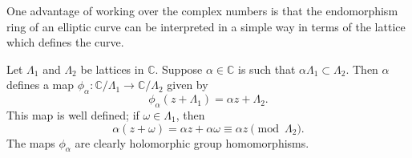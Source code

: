 One advantage of working over the complex numbers is that the endomorphism ring of an
elliptic curve can be interpreted in a simple way in terms of the lattice which
defines the curve.

Let $\Lambda_{1}$ and $\Lambda_{2}$ be lattices in $\mathbb{C}$. Suppose $\alpha \in
\mathbb{C}$ is such that $\alpha\Lambda_{1} \subset \Lambda_{2}$.  Then $\alpha$
defines a map $\phi_{\alpha} \colon \mathbb{C}/\Lambda_{1} \rightarrow
\mathbb{C}/\Lambda_{2}$ given by
\begin{equation}
  \label{eq:phi_alpha}
  \phi_{\alpha}(z + \Lambda_{1}) = \alpha z + \Lambda_{2}.
\end{equation}
This map is well defined; if $\omega \in \Lambda_{1}$, then
\begin{equation*}
  \alpha(z + \omega) = \alpha z + \alpha\omega \equiv \alpha z \pmod{\Lambda_{2}}.
\end{equation*}
The maps $\phi_{\alpha}$ are clearly holomorphic group homomorphisms.

